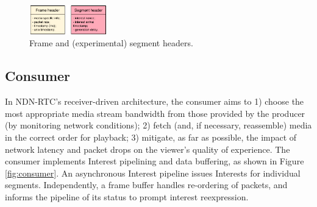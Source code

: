 \documentclass{icn/sig-alternate-2013} %
\newcommand{\ndnrtcName}{NDN-RTC} %
\begin{document}

%

%


\begin{figure}[t!]
\centering
\includegraphics[width=0.3\textwidth]{data-struct}
\vspace{-4pt}
\caption{Frame and (experimental) segment headers.}
\label{fig:data-struct}
\end{figure}


\subsection{Consumer}
\label{sec:consumer}

In \ndnrtcName{}'s receiver-driven architecture, the consumer aims to 1) choose the most appropriate media stream bandwidth from those provided by the producer (by monitoring network conditions); 2) fetch (and, if necessary, reassemble) media in the correct order for playback; 3) mitigate, as far as possible, the impact of network latency and packet drops on the viewer's quality of experience.  
The consumer implements Interest pipelining and data buffering, as shown in Figure \ref{fig:consumer}. An asynchronous Interest pipeline issues Interests for individual segments. Independently, a frame buffer handles re-ordering of packets, and informs the pipeline of its status to prompt interest reexpression.
\end{document}
